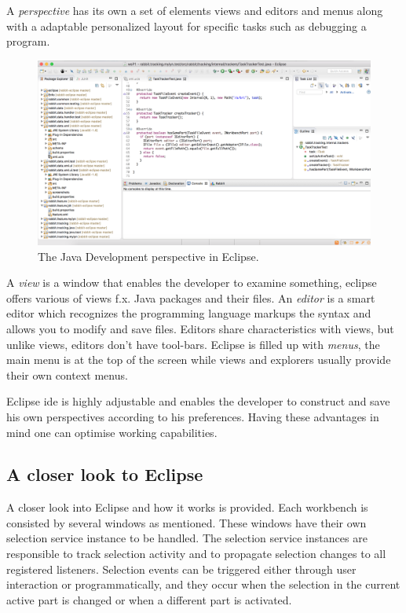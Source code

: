 A \textit{perspective} has its own a set of elements views and editors and menus along with a adaptable personalized layout for specific tasks such as debugging a program. 
\label{sec:TheEclipseIDE:menusviewsandeditors}
	\begin{figure}[!ht]
		\begin{center}
		 
        \includegraphics[width=\textwidth]{figures/eclipse_workspace.png}
		\end{center}
		\caption{The Java Development perspective in Eclipse.}
		\label{fig:eclipse_workspace}
	\end{figure}
A \textit{view} is a window that enables the developer to examine something, eclipse offers various of views f.x. Java packages and their files. An \textit{editor} is a smart editor which recognizes the programming language markups the syntax and allows you to modify and save files. Editors share characteristics with views, but unlike views, editors don't have tool-bars. Eclipse is filled up with \textit{menus}, the main menu is at the top of the screen while views and explorers usually provide their own context menus.

Eclipse \gls{ide} is highly adjustable and enables the developer to construct and save his own perspectives according to his preferences. Having these advantages in mind one can optimise working capabilities.

\subsection{A closer look to Eclipse}
A closer look into Eclipse and how it works is provided. Each workbench is consisted by several windows as mentioned. These windows have their own selection service instance to be handled. The selection service instances are responsible to track selection activity and to propagate selection changes to all registered listeners. Selection events can be triggered either through user interaction or programmatically, and they occur when the selection in the current active part is changed or when a different part is activated. 

